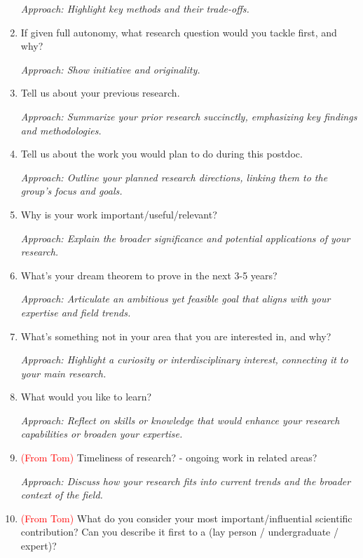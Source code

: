\documentclass[12pt]{article}
\numberwithin{equation}{section}
\newcommand{\red}[1]{\textcolor{red}{#1}}
\begin{document}
\begin{enumerate}
    \textit{Approach: Highlight key methods and their trade-offs.}

    \item If given full autonomy, what research question would you tackle first, and why?
    
    \textit{Approach: Show initiative and originality.}

    \item Tell us about your previous research.
    
    \textit{Approach: Summarize your prior research succinctly, emphasizing key findings and methodologies.}

    \item Tell us about the work you would plan to do during this postdoc.
    
    \textit{Approach: Outline your planned research directions, linking them to the group's focus and goals.}

    \item Why is your work important/useful/relevant?
    
    \textit{Approach: Explain the broader significance and potential applications of your research.}

    \item What’s your dream theorem to prove in the next 3-5 years?
    
    \textit{Approach: Articulate an ambitious yet feasible goal that aligns with your expertise and field trends.}

    \item What’s something not in your area that you are interested in, and why?
    
    \textit{Approach: Highlight a curiosity or interdisciplinary interest, connecting it to your main research.}

    \item What would you like to learn?
    
    \textit{Approach: Reflect on skills or knowledge that would enhance your research capabilities or broaden your expertise.}


        \item \red{(From Tom)} Timeliness of research? - ongoing work in related areas?
    
    \textit{Approach: Discuss how your research fits into current trends and the broader context of the field.}

    \item \red{(From Tom)} What do you consider your most important/influential scientific contribution? Can you describe it first to a (lay person / undergraduate / expert)?
    

\end{enumerate}
\end{document}
